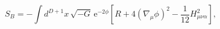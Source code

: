 \begin{equation}
S_B
   = -  \int d^{D+1}x\, \sqrt{-G}\, \mathrm{e}^{-2\phi}
        \left[ R 
              +4 (\nabla_{\mu}\phi)^2
              -\frac{1}{12}H^2_{\mu\nu\alpha}
        \right], 
\end{equation}

